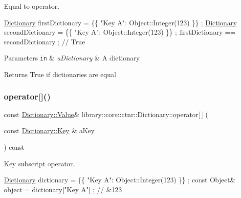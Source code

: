 Equal to operator. 


\begin{DoxyCode}
\hyperlink{classlibrary_1_1core_1_1ctnr_1_1_dictionary_a823a08112d9ee271f9fa5833f030ea1a}{Dictionary} firstDictionary = \{\{ \textcolor{stringliteral}{"Key A"}: Object::Integer(123) \}\} ;
\hyperlink{classlibrary_1_1core_1_1ctnr_1_1_dictionary_a823a08112d9ee271f9fa5833f030ea1a}{Dictionary} secondDictionary = \{\{ \textcolor{stringliteral}{"Key A"}: Object::Integer(123) \}\} ;
firstDictionary == secondDictionary ; \textcolor{comment}{// True}
\end{DoxyCode}



\begin{DoxyParams}[1]{Parameters}
\mbox{\tt in}  & {\em a\+Dictionary} & A dictionary \\
\hline
\end{DoxyParams}
\begin{DoxyReturn}{Returns}
True if dictionaries are equal 
\end{DoxyReturn}
\mbox{\label{classlibrary_1_1core_1_1ctnr_1_1_dictionary_ac5373f89362c83fee85e2d147d16eb40}} 
\subsubsection{\texorpdfstring{operator[]()}{operator[]()}\hspace{0.1cm}{\footnotesize\ttfamily [1/2]}}
{\footnotesize\ttfamily const \hyperlink{classlibrary_1_1core_1_1ctnr_1_1_object}{Dictionary\+::\+Value}\& library\+::core\+::ctnr\+::\+Dictionary\+::operator\mbox{[}$\,$\mbox{]} (\begin{DoxyParamCaption}\item[{const \hyperlink{classlibrary_1_1core_1_1types_1_1_string}{Dictionary\+::\+Key} \&}]{a\+Key }\end{DoxyParamCaption}) const}



Key subscript operator. 


\begin{DoxyCode}
\hyperlink{classlibrary_1_1core_1_1ctnr_1_1_dictionary_a823a08112d9ee271f9fa5833f030ea1a}{Dictionary} dictionary = \{\{ \textcolor{stringliteral}{"Key A"}: Object::Integer(123) \}\} ;
\textcolor{keyword}{const} Object& \textcolor{keywordtype}{object} = dictionary[\textcolor{stringliteral}{"Key A"}] ; \textcolor{comment}{// &123}
\end{DoxyCode}



